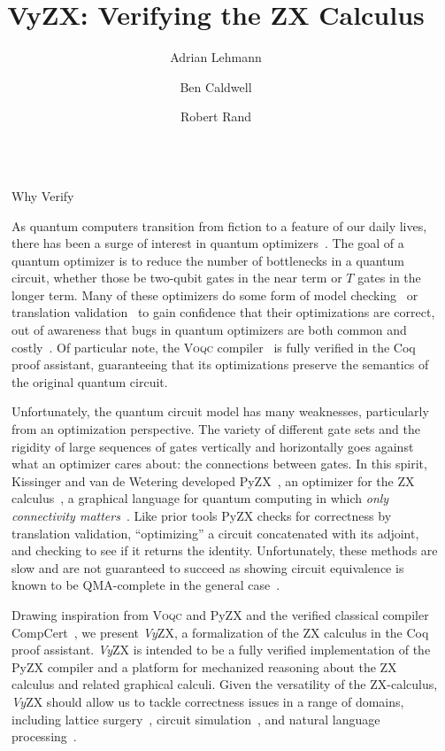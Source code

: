 \documentclass[final]{beamer}
\title{VyZX: Verifying the ZX Calculus}
\author{Adrian Lehmann \inst{1} \and Ben Caldwell \inst{1} \and Robert Rand \inst{1}}
\institute[shortinst]{\inst{1} University of Chicago}
\newlength{\sepwidth}
\newlength{\colwidth}
\newcommand{\separatorcolumn}{\begin{column}{\sepwidth}\end{column}}
\newcommand{\VyZX}{\textsl{Vy}\textsc{ZX}\xspace}
\newcommand{\pyZX}{PyZX\xspace}
\newcommand{\VOQC}{\textsc{Voqc}\xspace}
\begin{document}
\begin{frame}[t]
\begin{columns}[t]
\separatorcolumn

\begin{column}{\colwidth}

  \begin{block}{Why Verify}

    As quantum computers transition from fiction to a feature of our daily lives, there has been a surge of interest in quantum optimizers~\cite{nam2018automated,shi2019certiq,smith2019quantum,kissinger2020Pyzx,Amy2019,mingkuan2022quartz}. 
    The goal of a quantum optimizer is to reduce the number of bottlenecks in a quantum circuit, whether those be two-qubit gates in the near term or $T$ gates in the longer term. 
    Many of these optimizers do some form of model checking~\cite{shi2019certiq,mingkuan2022quartz} or translation validation~\cite{smith2019quantum,kissinger2020Pyzx} to gain confidence that their optimizations are correct, out of awareness that bugs in quantum optimizers are both common and costly~\cite{kissinger2020Pyzx}. 
    Of particular note, the \VOQC compiler~\cite{hietala-et-al-2021-VOQC} is fully verified in the Coq proof assistant, guaranteeing that its optimizations preserve the semantics of the original quantum circuit.

    Unfortunately, the quantum circuit model has many weaknesses, particularly from an optimization perspective. 
    The variety of different gate sets and the rigidity of large sequences of gates vertically and horizontally goes against what an optimizer cares about: the connections between gates.
    In this spirit, Kissinger and van de Wetering developed PyZX~\cite{kissinger2020Pyzx}, an optimizer for the ZX calculus~\cite{coecke-duncan-zx}, a graphical language for quantum computing in which \emph{only connectivity matters}~\cite{coecke-kissinger-2017-picturing-q-proc}. 
    Like prior tools \pyZX checks for correctness by translation validation, ``optimizing'' a circuit concatenated with its adjoint, and checking to see if it returns the identity.
    Unfortunately, these methods are slow and are not guaranteed to succeed as showing circuit equivalence is known to be QMA-complete in the general case~\cite{janzing2003-id-qma}.

    Drawing inspiration from \VOQC and \pyZX and the verified classical compiler CompCert~\cite{leroy2009compcert}, we present \VyZX, a formalization of the ZX calculus in the Coq~\cite{Coq12} proof assistant. 
    \VyZX is intended to be a fully verified implementation of the \pyZX compiler and a platform for mechanized reasoning about the ZX calculus and related graphical calculi. Given the versatility of the ZX-calculus, 
    \VyZX should allow us to tackle correctness issues in a range of domains, including lattice surgery~\cite{deBeaudrap2020zxcalculusis}, circuit simulation~\cite{kissinger2020simulation}, and natural language processing~\cite{coecke2020nlpzx}.


\end{block}
\end{column}
\end{columns}
\end{frame}
\end{document}

